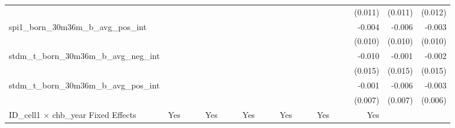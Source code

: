 \begin{tabular}{lrrrrrrrrrrrrrrrrrr}
                                            &              &              &              &              &              &              &              &              &               &              &              &               &              &              &               &      (0.011) &      (0.011) &       (0.012) \\ 
spi1\_born\_30m36m\_b\_avg\_pos\_int        &              &              &              &              &              &              &              &              &               &              &              &               &              &              &               &       -0.004 &       -0.006 &        -0.003 \\ 
                                            &              &              &              &              &              &              &              &              &               &              &              &               &              &              &               &      (0.010) &      (0.010) &       (0.010) \\ 
stdm\_t\_born\_30m36m\_b\_avg\_neg\_int     &              &              &              &              &              &              &              &              &               &              &              &               &              &              &               &       -0.010 &       -0.001 &        -0.002 \\ 
                                            &              &              &              &              &              &              &              &              &               &              &              &               &              &              &               &      (0.015) &      (0.015) &       (0.015) \\ 
stdm\_t\_born\_30m36m\_b\_avg\_pos\_int     &              &              &              &              &              &              &              &              &               &              &              &               &              &              &               &       -0.001 &       -0.006 &        -0.003 \\ 
                                            &              &              &              &              &              &              &              &              &               &              &              &               &              &              &               &      (0.007) &      (0.007) &       (0.006) \\ 
\midrule
ID\_cell1 $\times$ chb\_year Fixed Effects  &          Yes &              &              &          Yes &              &              &          Yes &              &               &          Yes &              &               &          Yes &              &               &          Yes &              &               \\ 

\end{tabular}
